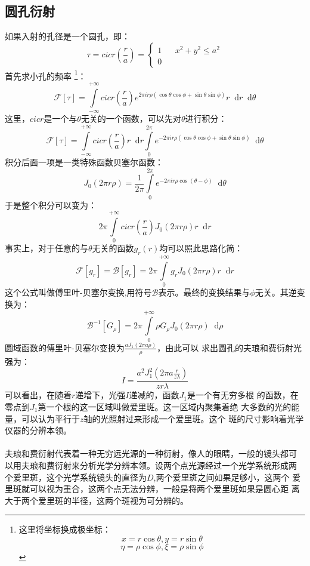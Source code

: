 \documentclass{article}
\newcommand*{\dif}{\mathop{}\!\mathrm{d}}
\begin{document}
\subsection{圆孔衍射}
如果入射的孔径是一个圆孔，即：
\[
  \tau=cicr(\frac{r}{a})=\left \{
    \begin{array}{rcl}
      1&&x^2+y^2\leq a^2\\
      0&&{}
    \end{array}
  \right
  .
\]
首先求小孔的频率
\footnote{
  这里将坐标换成极坐标：
  \[x=r\cos{\theta},y=r\sin{\theta}\]
  \[\eta=\rho\cos{\phi},\xi=\rho\sin{\phi}\]}：
\[\mathscr{F}[\tau]=\int\limits_{-\infty}^{+\infty}cicr(\frac{r}{a})e^{2\pi
    ir\rho(\cos{\theta}\cos{\phi}+\sin{\theta}\sin{\phi})}r\dif
  r\dif\theta\]
这里，$cicr$是一个与$\theta$无关的一个函数，可以先对$\theta$进行积分：
\[\mathscr{F}[\tau]=\int\limits_{-\infty}^{+\infty}cicr(\frac{r}{a})r\dif
  r \int\limits_{0}^{2\pi}e^{-2\pi i
    r\rho(\cos{\theta}\cos{\phi}+\sin{\theta}\sin{\phi})}\dif\theta\]
积分后面一项是一类特殊函数贝塞尔函数：
\[J_0(2\pi r\rho)=\frac{1}{2\pi}\int\limits_{0}^{2\pi}e^{-2\pi i
    r\rho\cos(\theta-\phi)}\dif \theta\]
于是整个积分可以变为：
\[2\pi\int\limits_{0}^{+\infty} cicr(\frac{r}{a})J_0(2\pi
  r\rho)r\dif r\]
事实上，对于任意的与$\theta$无关的函数$g_r(r)$均可以照此思路化简：
\begin{equation}
  \label{eq:8}
  \mathscr{F}[g_r]=\mathscr{B}[g_r]=2\pi\int\limits_{0}^{+\infty}g_rJ_0(2\pi
  r\rho)r\dif r
\end{equation}
这个公式叫做傅里叶-贝塞尔变换,用符号$\mathscr{B}$表示。最终的变换结果与$\phi$无关。其逆变换为：
\begin{equation}
  \label{eq:9}
  \mathscr{B}^{-1}[G_\rho]=2\pi \int\limits_0^{+\infty}\rho
  G_{\rho}J_0(2\pi r\rho)\dif \rho
\end{equation}
圆域函数的傅里叶-贝塞尔变换为$\frac{aJ_1(2\pi a\rho)}{\rho}$，由此可以
求出圆孔的夫琅和费衍射光强为：
\[I=\frac{a^2J_1^2(2\pi a \frac{r}{z\lambda})}{zr\lambda}\]
可以看出，在随着$r$递增下，光强$I$递减的，函数$J_1$是一个有无穷多根
的函数，在零点到$J_1$第一个根的这一区域叫做爱里斑。这一区域内聚集着绝
大多数的光的能量，可以认为平行于$z$轴的光照射过来形成一个爱里斑。这个
斑的尺寸影响着光学仪器的分辨本领。
\paragraph{}
夫琅和费衍射代表着一种无穷远光源的一种衍射，像人的眼睛，一般的镜头都可
以用夫琅和费衍射来分析光学分辨本领。设两个点光源经过一个光学系统形成两
个爱里斑，这个光学系统镜头的直径为$D$,两个爱里斑之间如果足够小，这两个
爱里斑就可以视为重合，这两个点无法分辨，一般是将两个爱里斑如果是圆心距
离大于两个爱里斑的半径，这两个斑视为可分辨的。
\end{document}
